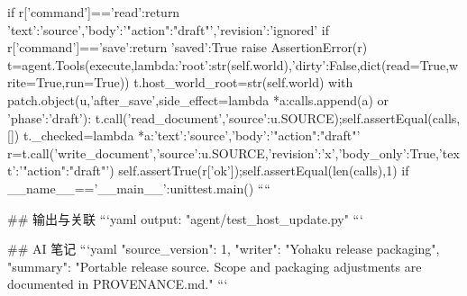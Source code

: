    if r['command']=='read':return {'text':'source','body':'{"action":"draft"}','revision':'ignored'}
   if r['command']=='save':return {'saved':True}
   raise AssertionError(r)
  t=agent.Tools(execute,lambda:{'root':str(self.world),'dirty':False},dict(read=True,write=True,run=True))
  t.host_world_root=str(self.world)
  with patch.object(u,'after_save',side_effect=lambda *a:calls.append(a) or {'phase':'draft'}):
   t.call('read_document',{'source':u.SOURCE});self.assertEqual(calls,[])
   t._checked=lambda *a:{'text':'source','body':'{"action":"draft"}'}
   r=t.call('write_document',{'source':u.SOURCE,'revision':'x','body_only':True,'text':'{"action":"draft"}'})
   self.assertTrue(r['ok']);self.assertEqual(len(calls),1)
if __name__=='__main__':unittest.main()
````

## 输出与关联
```yaml
output: "agent/test_host_update.py"
```

## AI 笔记
```yaml
{"source_version": 1, "writer": "Yohaku release packaging", "summary": "Portable release source. Scope and packaging adjustments are documented in PROVENANCE.md."}
```
